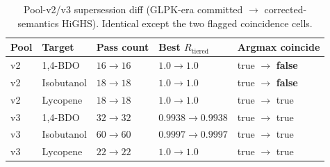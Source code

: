 \documentclass[12pt,a4paper]{article}
\begin{document}
\begin{table}[h]
\centering
\small
\caption{Pool-v2/v3 supersession diff (GLPK-era committed $\to$ corrected-semantics HiGHS). Identical except the two flagged coincidence cells.}
\label{tab:v23diff}
\begin{tabular}{l l l l l}
\hline
Pool & Target & Pass count & Best $R_{\mathrm{tiered}}$ & Argmax coincide \\
\hline
v2 & 1,4-BDO & $16 \to 16$ & $1.0 \to 1.0$ & true $\to$ \textbf{false} \\
v2 & Isobutanol & $18 \to 18$ & $1.0 \to 1.0$ & true $\to$ \textbf{false} \\
v2 & Lycopene & $18 \to 18$ & $1.0 \to 1.0$ & true $\to$ true \\
v3 & 1,4-BDO & $32 \to 32$ & $0.9938 \to 0.9938$ & true $\to$ true \\
v3 & Isobutanol & $60 \to 60$ & $0.9997 \to 0.9997$ & true $\to$ true \\
v3 & Lycopene & $22 \to 22$ & $1.0 \to 1.0$ & true $\to$ true \\
\hline
\end{tabular}
\end{table}
\end{document}
